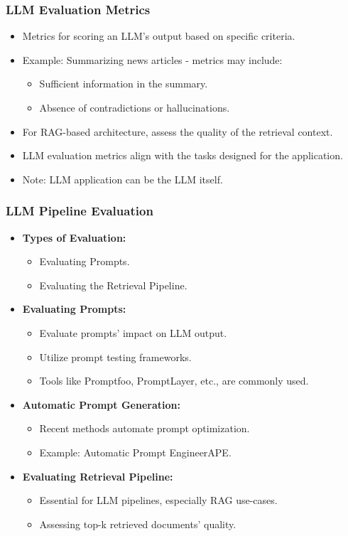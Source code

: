 \begin{frame}[fragile]\frametitle{LLM Evaluation Metrics}
  \begin{itemize}
    \item Metrics for scoring an LLM's output based on specific criteria.
    \item Example: Summarizing news articles - metrics may include:
      \begin{itemize}
        \item Sufficient information in the summary.
        \item Absence of contradictions or hallucinations.
      \end{itemize}
    \item For RAG-based architecture, assess the quality of the retrieval context.
    \item LLM evaluation metrics align with the tasks designed for the application.
    \item Note: LLM application can be the LLM itself.
  \end{itemize}
\end{frame}


\begin{frame}[fragile]\frametitle{LLM Pipeline Evaluation}
  \begin{itemize}
    \item \textbf{Types of Evaluation:}
      \begin{itemize}
        \item Evaluating Prompts.
        \item Evaluating the Retrieval Pipeline.
      \end{itemize}  
    \item \textbf{Evaluating Prompts:}
      \begin{itemize}
        \item Evaluate prompts' impact on LLM output.
        \item Utilize prompt testing frameworks.
        \item Tools like Promptfoo, PromptLayer, etc., are commonly used.
      \end{itemize}
    \item \textbf{Automatic Prompt Generation:}
      \begin{itemize}
        \item Recent methods automate prompt optimization.
        \item Example: Automatic Prompt EngineerAPE.
      \end{itemize}
    \item \textbf{Evaluating Retrieval Pipeline:}
      \begin{itemize}
        \item Essential for LLM pipelines, especially RAG use-cases.
        \item Assessing top-k retrieved documents' quality.
      \end{itemize}	  
  \end{itemize}
\end{frame}


